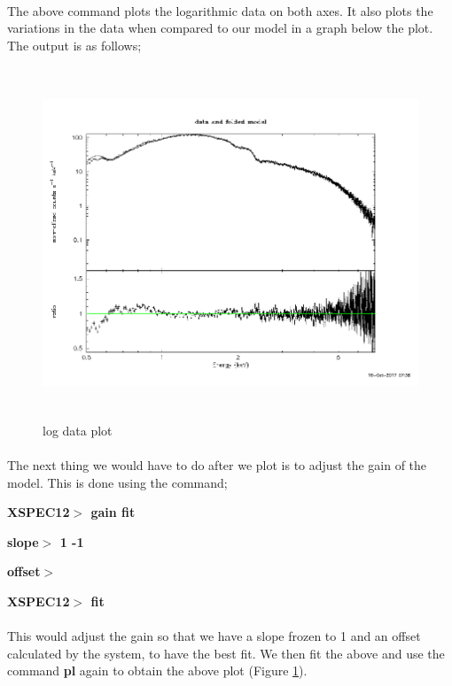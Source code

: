 \documentclass[a4paper,twoside]{report}
\numberwithin{equation}{section}
\begin{document}
\paragraph{}
The above command plots the logarithmic data on both axes. It also plots the variations in the data when compared to our model in a graph below the plot. The output is as follows;
\begin{figure}[h]
\includegraphics[width=1.0\linewidth, height=10.5cm]{7.jpg}
\caption{log data plot}
\label{log_dp}
\end{figure}
\paragraph{}
The next thing we would have to do after we plot is to adjust the gain of the model. This is done using the command; 
\begin{center}
\item \large \textbf{XSPEC12$>$ gain fit}
\item \large \textbf{slope$>$ 1 -1}
\item \large \textbf{offset$>$   }
\item \large \textbf{XSPEC12$>$ fit}
\end{center}
\paragraph{}
This would adjust the gain so that we have a slope frozen to 1 and an offset calculated by the system, to have the best fit. We then fit the above and use the command \textbf{pl} again to obtain the above plot (Figure \ref{log_dp}). 
\end{document}

